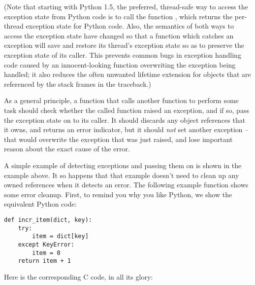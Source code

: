 \documentclass[twoside]{report}
\begin{document}
(Note that starting with Python 1.5, the preferred, thread-safe way to 
access the exception state from Python code is to call the function 
, which returns the per-thread exception state 
for Python code.  Also, the semantics of both ways to access the 
exception state have changed so that a function which catches an 
exception will save and restore its thread's exception state so as to 
preserve the exception state of its caller.  This prevents common bugs 
in exception handling code caused by an innocent-looking function 
overwriting the exception being handled; it also reduces the often 
unwanted lifetime extension for objects that are referenced by the 
stack frames in the traceback.)

As a general principle, a function that calls another function to 
perform some task should check whether the called function raised an 
exception, and if so, pass the exception state on to its caller.  It 
should discards any object references that it owns, and returns an 
error indicator, but it should \emph{not} set another exception -- 
that would overwrite the exception that was just raised, and lose 
important reason about the exact cause of the error.

A simple example of detecting exceptions and passing them on is shown 
in the  example above.  It so happens that that 
example doesn't need to clean up any owned references when it detects 
an error.  The following example function shows some error cleanup.  
First, to remind you why you like Python, we show the equivalent
Python code:

\begin{verbatim}
def incr_item(dict, key):
    try:
        item = dict[key]
    except KeyError:
        item = 0
    return item + 1
\end{verbatim}

Here is the corresponding C code, in all its glory:
\end{document}
